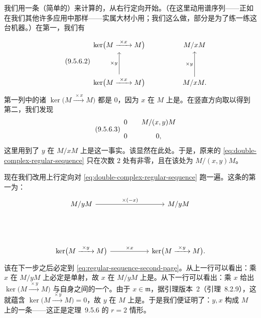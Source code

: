 我们用一条（简单的）\trSpectralSequence{}来计算\trTotalComplex{}的\trCohomology，从右行定向开始。（在这里动用谱序列——正如在我们其他许多应用中那样——实属大材小用；我们这么做，部分是为了练一练这台机器。）在第一\trPage，我们有
\begin{equation*}\tag{9.5.6.2}\label{eq:regular-sequence-first-page}
\begin{tikzcd}[row sep=3.2em, column sep=4.5em]
\ker\bigl(M\mathrel{\xrightarrow{\ \times x\ }}M\bigr) & M/xM \\
\ker\bigl(M\mathrel{\xrightarrow{\ \times x\ }}M\bigr) \ar[u, "\times y"] & M/xM. \ar[u, "\times y"]
\end{tikzcd}
\end{equation*}
第一列中的诸 $\ker\bigl(M\mathrel{\xrightarrow{\ \times x\ }}M\bigr)$ 都是 $0$，因为 $x$ 在 $M$ 上是\trNonZerodivisor。在竖直方向取\trHomology{}以得到第二\trPage，我们发现
\begin{equation*}\tag{9.5.6.3}\label{eq:regular-sequence-second-page}
\begin{array}{c@{\qquad}c}
0 & M/(x,y)M\\[0.8em]
0 & 0,
\end{array}
\end{equation*}
这里用到了 $y$ 在 $M/xM$ 上是\trNonZerodivisor{}这一事实。该\trSpectralSequence{}显然在此处\trConverge。于是，原来的\trDoubleComplex{} \eqref{eq:double-complex-regular-sequence} 只在次数 $2$ 处有非零\trCohomology，且在该处\trCohomology{}为 $M/(x,y)M$。

现在我们改用上行定向对 \eqref{eq:double-complex-regular-sequence} 跑一遍\trSpectralSequence。这条\trSpectralSequence{}的第一\trPage{}为：
\[
\begin{tikzcd}[row sep=4.6em, column sep=5.5em]
M/yM \ar[r, "\times(-x)"] & M/yM \\
\ker\bigl(M\mathrel{\xrightarrow{\ \times y\ }}M\bigr) \ar[r, "\times x"] & \ker\bigl(M\mathrel{\xrightarrow{\ \times y\ }}M\bigr).
\end{tikzcd}
\]
该\trSpectralSequence{}在下一步之后必定\trConverge{}到 \eqref{eq:regular-sequence-second-page}。从上一行可以看出：乘 $x$ 在 $M/yM$ 上必定是单射，故 $x$ 在 $M/yM$ 上是\trNonZerodivisor。从下一行可以看出：乘 $x$ 给出 $\ker\bigl(M\mathrel{\xrightarrow{\ \times y\ }}M\bigr)$ 与自身之间的一个\trIsomorphism。由于 $x\in\mathfrak{m}$，据\trNakayama{}引理版本~2（引理~8.2.9），这就蕴含 $\ker\bigl(M\mathrel{\xrightarrow{\ \times y\ }}M\bigr)=0$，故 $y$ 在 $M$ 上是\trNonZerodivisor。于是我们便证明了：$y,x$ 构成 $M$ 上的一条\trRegularSequence——这正是定理~9.5.6 的 $r=2$ 情形。

